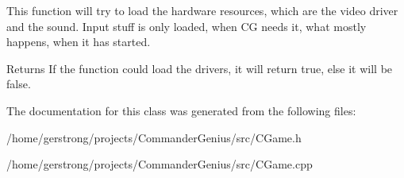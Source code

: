 This function will try to load the hardware resources, which are the video driver and the sound. Input stuff is only loaded, when CG needs it, what mostly happens, when it has started. 

\begin{DoxyReturn}{Returns}
If the function could load the drivers, it will return true, else it will be false. 
\end{DoxyReturn}


The documentation for this class was generated from the following files:\begin{DoxyCompactItemize}
\item 
/home/gerstrong/projects/CommanderGenius/src/CGame.h\item 
/home/gerstrong/projects/CommanderGenius/src/CGame.cpp\end{DoxyCompactItemize}
